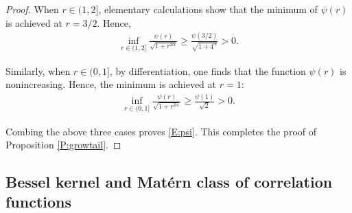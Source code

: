 \documentclass[12pt]{report}
\theoremstyle{plain}
\theoremstyle{definition}
\numberwithin{equation}{section}
\begin{document}
\begin{proof}
	When $r\in(1,2]$, elementary calculations show that the minimum of $\psi(r)$ is achieved at
	$r=3/2$. Hence,
	\begin{align*}
	\inf_{r\in(1,2]} \frac{\psi(r)}{\sqrt{1+r^{2\alpha}}} \ge \frac{\psi(3/2) }{\sqrt{1+4^\alpha}}>0.
	\end{align*}
	
	Similarly, when $r\in (0,1]$, by differentiation, one finds that the function $\psi(r)$ is nonincreasing.
	Hence, the minimum is achieved at $r=1$:
	\begin{align*}
	\inf_{r\in(0,1]} \frac{\psi(r)}{\sqrt{1+r^{2\alpha}}} \ge \frac{\psi(1) }{\sqrt{2}}>0.
	\end{align*}
	
	Combing the above three cases proves \eqref{E:psi}. This completes the proof of Proposition
	\ref{P:growtail}.
\end{proof}

\subsection{Bessel kernel and Mat\'ern class of correlation functions} \label{SS:Bassel}
\end{document}
